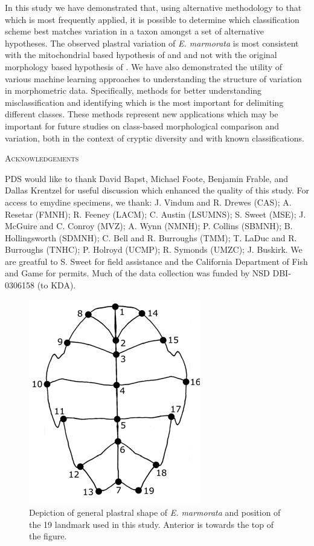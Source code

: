 \documentclass[12pt,letterpaper]{article}\usepackage{graphicx, color}
\renewcommand{\section}[1]{%
\bigskip
\begin{center}
\begin{Large}
\normalfont\scshape #1
\medskip
\end{Large}
\end{center}}
\begin{document}
In this study we have demonstrated that, using alternative methodology to that which is most frequently applied, it is possible to determine which classification scheme best matches variation in a taxon amongst a set of alternative hypotheses. The observed plastral variation of \textit{E. marmorata} is most consistent with the mitochondrial based hypothesis of \citet{Spinks2005} and \citet{Spinks2010} and not with the original morphology based hypothesis of \citet{Seeliger1945,Holland1992}. We have also demonstrated the utility of various machine learning approaches to understanding the structure of variation in morphometric data. Specifically, methods for better understanding misclassification and identifying which is the most important for delimiting different classes. These methods represent new applications which may be important for future studies on class-based morphological comparison and variation, both in the context of cryptic diversity and with known classifications.

\section{Acknowledgements}
PDS would like to thank David Bapst, Michael Foote, Benjamin Frable, and Dallas Krentzel for useful discussion which enhanced the quality of this study. For access to emydine specimens, we thank: J. Vindum and R. Drewes (CAS); A. Resetar (FMNH); R. Feeney (LACM); C. Austin (LSUMNS); S. Sweet (MSE); J. McGuire and C. Conroy (MVZ); A. Wynn (NMNH); P. Collins (SBMNH); B. Hollingsworth (SDMNH); C. Bell and R. Burroughs (TMM); T. LaDuc and R. Burroughs (TNHC); P. Holroyd (UCMP); R. Symonds (UMZC); J. Buskirk. We are greatful to S. Sweet for field assistance and the California Department of Fish and Game for permits. Much of the data collection was funded by NSD DBI-0306158 (to KDA).




\pagebreak

\begin{figure}[ht]
  \centering
  \includegraphics{figure/plastra}
  \caption{Depiction of general plastral shape of \textit{E. marmorata} and position of the 19 landmark used in this study. Anterior is towards the top of the figure.}
  \label{fig:plastra}
\end{figure}
\end{document}
